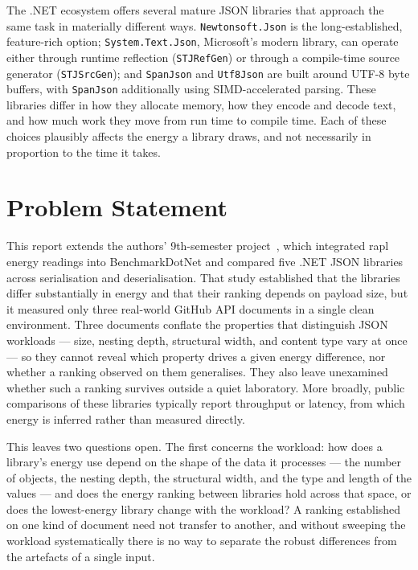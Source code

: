 The .NET ecosystem offers several mature JSON libraries that approach the same
task in materially different ways. \texttt{Newtonsoft.Json} is the
long-established, feature-rich option; \texttt{System.Text.Json}, Microsoft's
modern library, can operate either through runtime reflection
(\texttt{STJRefGen}) or through a compile-time source generator
(\texttt{STJSrcGen}); and \texttt{SpanJson} and \texttt{Utf8Json} are built
around UTF-8 byte buffers, with \texttt{SpanJson} additionally using
SIMD-accelerated parsing. These libraries differ in how they allocate memory,
how they encode and decode text, and how much work they move from run time to
compile time. Each of these choices plausibly affects the energy a library
draws, and not necessarily in proportion to the time it takes.

\section{Problem Statement}
\label{sec:intro-problem}

This report extends the authors' 9th-semester
project~\cite{geotoms2025microbenchmarking}, which integrated \gls{rapl}
energy readings into BenchmarkDotNet and compared five .NET JSON libraries
across serialisation and deserialisation. That study established that the
libraries differ substantially in energy and that their ranking depends on
payload size, but it measured only three real-world GitHub API documents in a
single clean environment. Three documents conflate the properties that
distinguish JSON workloads --- size, nesting depth, structural width, and
content type vary at once --- so they cannot reveal which property drives a
given energy difference, nor whether a ranking observed on them generalises.
They also leave unexamined whether such a ranking survives outside a quiet
laboratory. More broadly, public comparisons of these libraries typically
report throughput or latency, from which energy is inferred rather than
measured directly. %

This leaves two questions open. The first concerns the workload: how does a
library's energy use depend on the shape of the data it processes --- the
number of objects, the nesting depth, the structural width, and the type and
length of the values --- and does the energy ranking between libraries hold
across that space, or does the lowest-energy library change with the
workload? A ranking established on one kind of document need not transfer to
another, and without sweeping the workload systematically there is no way to
separate the robust differences from the artefacts of a single input.

